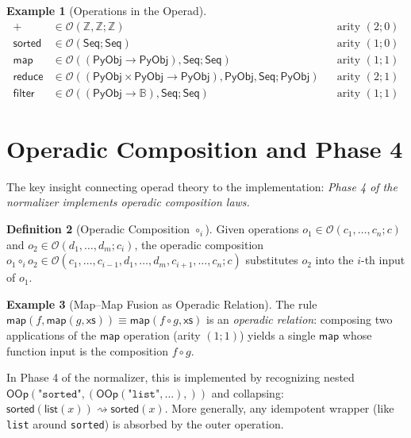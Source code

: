 \documentclass[11pt,a4paper]{report}
\theoremstyle{definition}
\newtheorem{definition}{Definition}[chapter]
\newtheorem{example}[definition]{Example}
\theoremstyle{plain}
\newcommand{\Int}{\mathbb{Z}}
\newcommand{\Bool}{\mathbb{B}}
\newcommand{\PyObj}{\mathsf{PyObj}}
\begin{document}
\begin{example}[Operations in the Operad]
\begin{align}
  + &\in \mathcal{O}(\Int, \Int; \Int) && \text{arity $(2; 0)$} \\
  \mathsf{sorted} &\in \mathcal{O}(\mathsf{Seq}; \mathsf{Seq})
    && \text{arity $(1; 0)$} \\
  \mathsf{map} &\in \mathcal{O}((\PyObj \to \PyObj), \mathsf{Seq};
    \mathsf{Seq}) && \text{arity $(1; 1)$} \\
  \mathsf{reduce} &\in \mathcal{O}((\PyObj \times \PyObj \to \PyObj),
    \PyObj, \mathsf{Seq}; \PyObj)
    && \text{arity $(2; 1)$} \\
  \mathsf{filter} &\in \mathcal{O}((\PyObj \to \Bool), \mathsf{Seq};
    \mathsf{Seq}) && \text{arity $(1; 1)$}
\end{align}
\end{example}

\section{Operadic Composition and Phase 4}

The key insight connecting operad theory to the implementation:
\emph{Phase 4 of the normalizer implements operadic composition laws.}

\begin{definition}[Operadic Composition $\circ_i$]
\label{def:operadic-composition}
Given operations $o_1 \in \mathcal{O}(c_1, \ldots, c_n; c)$ and
$o_2 \in \mathcal{O}(d_1, \ldots, d_m; c_i)$, the operadic
composition $o_1 \circ_i o_2 \in \mathcal{O}(c_1, \ldots, c_{i-1},
d_1, \ldots, d_m, c_{i+1}, \ldots, c_n; c)$ substitutes $o_2$
into the $i$-th input of $o_1$.
\end{definition}

\begin{example}[Map--Map Fusion as Operadic Relation]
The rule $\mathsf{map}(f, \mathsf{map}(g, \mathsf{xs}))
\equiv \mathsf{map}(f \circ g, \mathsf{xs})$ is an
\emph{operadic relation}: composing two applications of the
$\mathsf{map}$ operation (arity $(1;1)$) yields a single
$\mathsf{map}$ whose function input is the composition $f \circ g$.

In Phase 4 of the normalizer, this is implemented by recognizing
nested $\mathsf{OOp}(\texttt{"sorted"}, (\mathsf{OOp}
(\texttt{"list"}, \ldots),))$ and collapsing:
$\mathsf{sorted}(\mathsf{list}(x)) \rightsquigarrow \mathsf{sorted}(x)$.
More generally, any idempotent wrapper (like \texttt{list} around
\texttt{sorted}) is absorbed by the outer operation.
\end{example}
\end{document}
